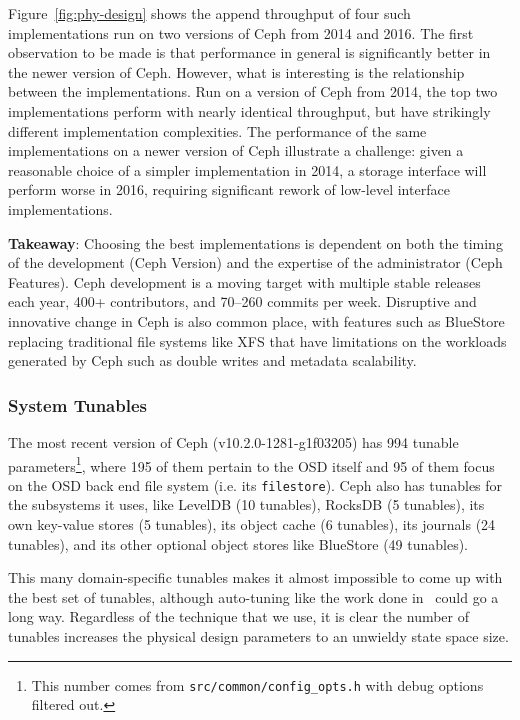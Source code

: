 Figure~\ref{fig:phy-design} shows the append throughput of four such
implementations run on two versions of Ceph from 2014 and 2016. The first
observation to be made is that performance in general is significantly better
in the newer version of Ceph. However, what is interesting is the relationship
between the implementations. Run on a version of Ceph from 2014, the top two
implementations perform with nearly identical throughput, but have strikingly
different implementation complexities. The performance of the same
implementations on a newer version of Ceph illustrate a challenge: given a
reasonable choice of a simpler implementation in 2014, a storage interface
will perform worse in 2016, requiring significant rework of low-level
interface implementations.

\textbf{Takeaway}: Choosing the best implementations is dependent on both the
timing of the development (Ceph Version) and the expertise of the
administrator (Ceph Features). Ceph development is a moving target with
multiple stable releases each year, 400+ contributors, and 70--260 commits per
week.  Disruptive and innovative change in Ceph is also common place, with
features such as BlueStore~\cite{weil:vault2016-bluestore} replacing
traditional file systems like XFS that have limitations on the workloads
generated by Ceph such as double writes and metadata scalability. 

\subsubsection{System Tunables}

The most recent version of Ceph (v10.2.0-1281-g1f03205) has 994 tunable
parameters\footnote{This number comes from \texttt{src/common/config\_opts.h}
with debug options filtered out.}, where 195 of them pertain to the OSD itself
and 95 of them focus on the OSD back end file system (i.e. its
\texttt{filestore}). Ceph also has tunables for the subsystems it uses, like
LevelDB (10 tunables), RocksDB (5 tunables), its own key-value stores (5
tunables), its object cache (6 tunables), its journals (24 tunables), and its
other optional object stores like BlueStore (49 tunables).

This many domain-specific tunables makes it almost impossible to come up with
the best set of tunables, although auto-tuning like the work done
in~\cite{behzad:sc2013-autotuning} could go a long way. Regardless of the
technique that we use, it is clear the number of tunables increases the
physical design parameters to an unwieldy state space size.

